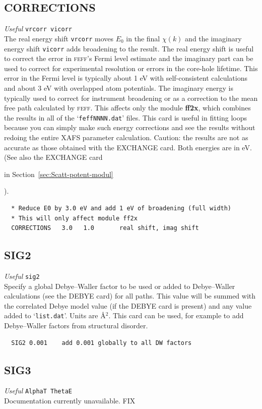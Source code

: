 \documentclass[11pt,oneside]{report} %
\renewcommand{\htmlref}[2]{\hyperlink{#2}{#1}}
\newcommand{\program}[1]{\textsc{#1}}
\newcommand{\feff}{\program{feff}}
\newenvironment{Card}[4]%
      {\vspace{3ex}%
        \subsection{#1}
        \quad\textsl{#3}\newline
        \quad\texttt{#2}\newline%
        \label{card:#4}\\}
      {}
\newcommand{\file}[1]{`\texttt{#1}'}
\newcommand{\module}[1]{\textrm{\bf{#1}}}
\renewcommand{\htmlref}[2]{{#1}} %
\begin{document}
\begin{Card}{CORRECTIONS}{vrcorr vicorr}{Useful}{cor}
  The real energy shift \texttt{vrcorr} moves $E_0$ in the final $\chi(k)$ and the
  imaginary energy shift \texttt{vicorr} adds broadening to the result. The real
  energy shift is useful to correct the error in {\feff}'s Fermi
  level estimate and the imaginary part can be used to correct
  for experimental resolution or errors in the core-hole lifetime.
  This error in the Fermi level is typically about 1 eV with self-consistent
  calculations and about 3 eV with overlapped atom potentials. The imaginary
  energy is typically used to correct for instrument broadening or as
  a correction to the mean free path calculated by {\feff}. This
  affects only the module \module{ff2x}, which combines the results in all of
  the \file{feffNNNN.dat} files. This card is useful in fitting loops
  because you can simply make such energy corrections and see the results
  without redoing the entire XAFS parameter calculation. Caution: the
  results are not as accurate as those obtained with the EXCHANGE card.
  Both energies are in eV.
  (See also the \htmlref{EXCHANGE}{card:exc} card
  \begin{latexonly}
    in Section~\ref{sec:Scatt-potent-modul}
  \end{latexonly}
  ).
\begin{verbatim}
  * Reduce E0 by 3.0 eV and add 1 eV of broadening (full width)
  * This will only affect module ff2x
  CORRECTIONS   3.0   1.0       real shift, imag shift
\end{verbatim}
\end{Card}



\begin{Card}{SIG2}{sig2}{Useful}{sig}
  Specify a global Debye--Waller factor to be used or added to
  Debye--Waller calculations (see the \htmlref{DEBYE}{card:deb2} card) for all paths. This
  value will be summed with the correlated Debye model value (if the
  DEBYE card is present) and any value added to \file{list.dat}. Units are
  \AA$^2$. This card can be used, for example to add Debye--Waller
  factors from structural disorder.

\begin{verbatim}
  SIG2 0.001    add 0.001 globally to all DW factors
\end{verbatim}
\end{Card}



\begin{Card}{SIG3}{AlphaT ThetaE}{Useful}{si3}
  Documentation currently unavailable. FIX
\end{Card}
\end{document}
